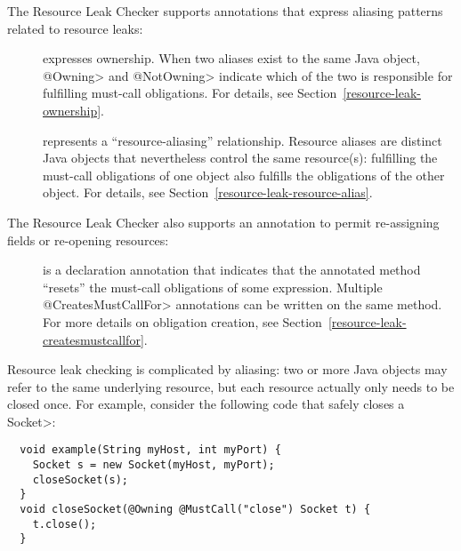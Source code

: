 The Resource Leak Checker supports annotations that express
aliasing patterns related to resource leaks:

\begin{description}

\item[]
\item[]
  expresses ownership.  When two aliases exist to the same Java object,
  \<@Owning> and \<@NotOwning> indicate which of the two is responsible for
  fulfilling must-call obligations.  For details, see
  Section~\ref{resource-leak-ownership}.

\item[]
  represents a ``resource-aliasing'' relationship.  Resource aliases are
  distinct Java objects that nevertheless control the same resource(s):
  fulfilling the must-call obligations of one object also
  fulfills the obligations of the other object.  For details,
  see Section~\ref{resource-leak-resource-alias}.

\end{description}

The Resource Leak Checker also supports an annotation to permit re-assigning
fields or re-opening resources:

\begin{description}

\item[]
  is a declaration annotation that indicates that the annotated method ``resets'' the must-call
  obligations of some expression.  Multiple \<@CreatesMustCallFor>
  annotations can be written on the same method.  For more details
  on obligation creation, see Section~\ref{resource-leak-createsmustcallfor}.

\end{description}



Resource leak checking is complicated by aliasing: two or more Java
objects may refer to the same underlying resource, but each resource
actually only needs to be closed once.
For example, consider the following code that safely closes a \<Socket>:

\begin{verbatim}
  void example(String myHost, int myPort) {
    Socket s = new Socket(myHost, myPort);
    closeSocket(s);
  }
  void closeSocket(@Owning @MustCall("close") Socket t) {
    t.close();
  }
\end{verbatim}

